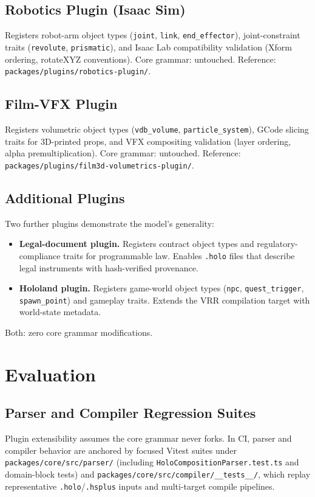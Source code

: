 \documentclass[sigconf,nonacm]{acmart}
\newcommand{\holo}{\texttt{.holo}}
\begin{document}
\subsection{Robotics Plugin (Isaac Sim)}
Registers robot-arm object types (\texttt{joint},
\texttt{link}, \texttt{end\_effector}), joint-constraint
traits (\texttt{revolute}, \texttt{prismatic}), and Isaac
Lab compatibility validation (Xform ordering, rotateXYZ
conventions). Core grammar: untouched.
Reference: \texttt{packages/plugins/robotics-plugin/}.

\subsection{Film-VFX Plugin}
Registers volumetric object types (\texttt{vdb\_volume},
\texttt{particle\_system}), GCode slicing traits for
3D-printed props, and VFX compositing validation (layer
ordering, alpha premultiplication). Core grammar: untouched.
Reference: \texttt{packages/plugins/film3d-volumetrics-plugin/}.

\subsection{Additional Plugins}
Two further plugins demonstrate the model's generality:
\begin{itemize}
  \item \textbf{Legal-document plugin.} Registers contract
    object types and regulatory-compliance traits for
    programmable law. Enables \holo{} files that describe
    legal instruments with hash-verified provenance.
  \item \textbf{Hololand plugin.} Registers game-world
    object types (\texttt{npc}, \texttt{quest\_trigger},
    \texttt{spawn\_point}) and gameplay traits. Extends
    the VRR compilation target with world-state metadata.
\end{itemize}
Both: zero core grammar modifications.

\section{Evaluation}
\label{sec:eval}

\subsection{Parser and Compiler Regression Suites}
Plugin extensibility assumes the core grammar never forks. In CI, parser and
compiler behavior are anchored by focused Vitest suites under
\texttt{packages/core/src/parser/} (including \texttt{HoloCompositionParser.test.ts}
and domain-block tests) and \texttt{packages/core/src/compiler/\_\_tests\_\_/},
which replay representative \texttt{.holo}/\texttt{.hsplus} inputs and multi-target compile
pipelines.
\end{document}
